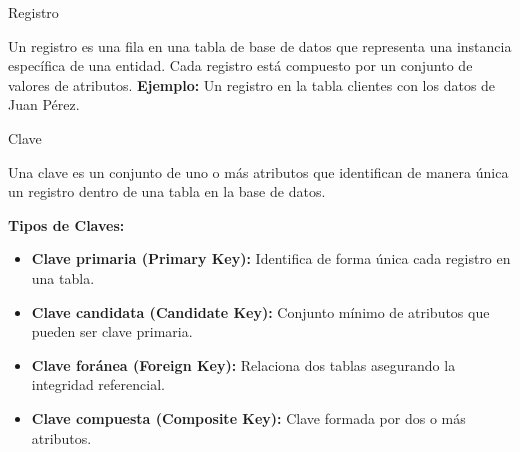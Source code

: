 \documentclass[spanish]{beamer}
\begin{document}
\begin{frame}{Registro}
    \begin{tcolorbox}[title=Registro,colback=yellow!5!white,colframe=yellow!75!black]
        Un registro es una fila en una tabla de base de datos que representa una instancia específica de una entidad. 
        Cada registro está compuesto por un conjunto de valores de atributos.
        \textbf{Ejemplo:} Un registro en la tabla clientes con los datos de Juan Pérez.
    \end{tcolorbox}
\end{frame}
\begin{frame}{Clave}
    \begin{tcolorbox}[title=Clave,colback=cyan!5!white,colframe=cyan!75!black]
        Una clave es un conjunto de uno o más atributos que identifican de manera única un registro dentro de una tabla en la base de datos.
        
        \textbf{Tipos de Claves:}
        \begin{itemize}
            \item \textbf{Clave primaria (Primary Key):} Identifica de forma única cada registro en una tabla.
            \item \textbf{Clave candidata (Candidate Key):} Conjunto mínimo de atributos que pueden ser clave primaria.
            \item \textbf{Clave foránea (Foreign Key):} Relaciona dos tablas asegurando la integridad referencial.
            \item \textbf{Clave compuesta (Composite Key):} Clave formada por dos o más atributos.
        \end{itemize}
   
    \end{tcolorbox}
\end{frame}
\end{document}
